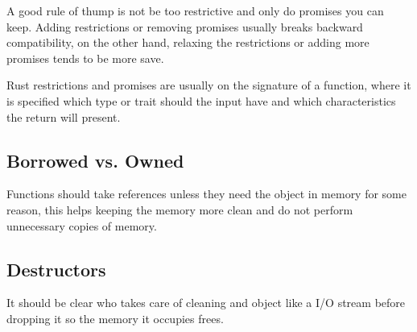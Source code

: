A good rule of thump is not be too restrictive and only do promises you can keep.
Adding restrictions or removing promises usually breaks backward compatibility,
on the other hand, relaxing the restrictions or adding more promises tends to be more save.

Rust restrictions and promises are usually on the signature of a function,
where it is specified which type or trait should the input have and which characteristics the return will present.

\subsection{Borrowed vs. Owned}

Functions should take references unless they need the object in memory for some reason,
this helps keeping the memory more clean and do not perform unnecessary copies of memory.

\subsection{Destructors}

It should be clear who takes care of cleaning and object like a I/O stream before dropping it so the memory it occupies frees.
